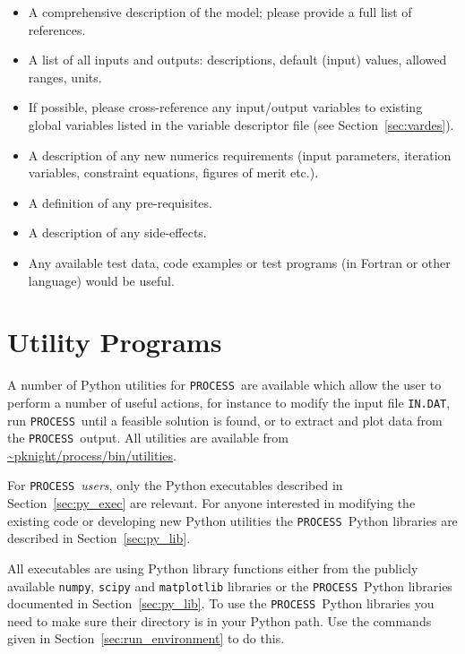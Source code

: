 \documentclass[11pt,a4paper]{report}
\newcommand{\indat}{\mbox{\texttt{IN.DAT}}}
\newcommand{\process}{\mbox{\texttt{PROCESS}}}
\newcommand{\setheader}[1]
 {\markright{\rlap{\lower0.8ex\hbox to\textwidth{\hrulefill}}{\bf#1}}}
\newcommand{\mychapter}[1]{\small\normalsize
 \setcounter{footnote}{0}
 \chapter{#1}
 \pagestyle{myheadings}
 \setheader{Chapter \thechapter\hspace{0.8em}#1}}
\begin{document}
\begin{itemize}

\item A comprehensive description of the model; please provide a full list of
  references.

\item A list of all inputs and outputs: descriptions, default (input) values,
  allowed ranges, units.

\item If possible, please cross-reference any input/output variables to
  existing global variables listed in the variable descriptor file (see
  Section~\ref{sec:vardes}).

\item A description of any new numerics requirements (input parameters,
  iteration variables, constraint equations, figures of merit etc.).

\item A definition of any pre-requisites.

\item A description of any side-effects.

\item Any available test data, code examples or test programs (in Fortran or
  other language) would be useful.

\end{itemize}


\mychapter{Utility Programs}
\label{chap:utilities}

A number of Python utilities for \process\ are available which allow the user
to perform a number of useful actions, for instance to modify the
input file \indat, run \process\ until a feasible solution is found, or to
extract and plot data from the \process\ output. All utilities are available
from \url{~pknight/process/bin/utilities}.

For \process\ \textit{users}, only the Python executables described in
Section~\ref{sec:py_exec} are relevant. For anyone interested in modifying the
existing code or developing new Python utilities the \process\ Python
libraries are described in Section~\ref{sec:py_lib}.

All executables are using Python library functions either from the publicly
available \texttt{numpy}, \texttt{scipy} and \texttt{matplotlib} libraries or
the \process\ Python libraries documented in Section~\ref{sec:py_lib}. To use
the \process\ Python libraries you need to make sure their directory is in
your Python path. Use the commands given in Section~\ref{sec:run_environment} to
do this.
\end{document}
